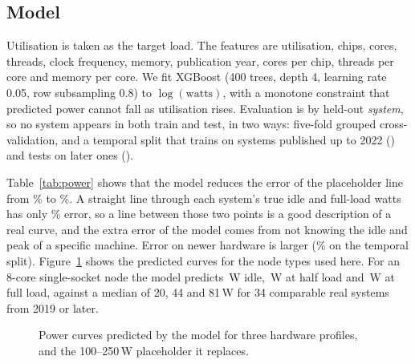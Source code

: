 \documentclass[conference]{IEEEtran}
\begin{document}
\subsection{Model}
Utilisation is taken as the target load. The features are utilisation, chips, cores, threads, clock frequency, memory, publication year, cores per chip, threads per core and memory per core. We fit XGBoost \cite{chen2016} (400 trees, depth 4, learning rate 0.05, row subsampling 0.8) to $\log(\mathrm{watts})$, with a monotone constraint that predicted power cannot fall as utilisation rises. Evaluation is by held-out \emph{system}, so no system appears in both train and test, in two ways: five-fold grouped cross-validation, and a temporal split that trains on systems published up to 2022 (\TrainSystems) and tests on later ones (\TestSystems).

\begin{table}[t]
\centering
\caption{Held-out error in watts per node (MAE) and percent (MAPE).}
\label{tab:power}
\footnotesize
\setlength{\tabcolsep}{3pt}

\end{table}

Table~\ref{tab:power} shows that the model reduces the error of the placeholder line from \MapePlaceholder\% to \MapeXgb\%. A straight line through each system's true idle and full-load watts has only \MapeOracle\% error, so a line between those two points is a good description of a real curve, and the extra error of the model comes from not knowing the idle and peak of a specific machine. Error on newer hardware is larger (\MapeTemporal\% on the temporal split). Figure~\ref{fig:power} shows the predicted curves for the node types used here. For an 8-core single-socket node the model predicts \SmallIdle{}\,W idle, \SmallHalf{}\,W at half load and \SmallPeak{}\,W at full load, against a median of 20, 44 and 81\,W for 34 comparable real systems from 2019 or later.

\begin{figure}[t]
\centering
{}
\caption{Power curves predicted by the model for three hardware profiles, and the 100--250\,W placeholder it replaces.}
\label{fig:power}
\end{figure}
\end{document}
